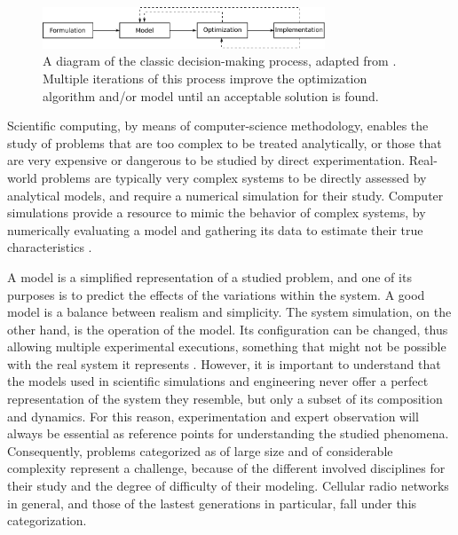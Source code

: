 \begin{figure}
\centering

\includegraphics[width=0.75\textwidth]{01-introduction/img/decision_making_process}

\caption{A diagram of the classic decision-making process, adapted from \cite{Talbi_Metaheuristics:2009}.
Multiple iterations of this process improve the optimization algorithm
and/or model until an acceptable solution is found. \label{fig:01-decision_making_process}}
\end{figure}


\bigskip{}


Scientific computing, by means of computer-science methodology, enables
the study of problems that are too complex to be treated analytically,
or those that are very expensive or dangerous to be studied by direct
experimentation. Real-world problems are typically very complex systems
to be directly assessed by analytical models, and require a numerical
simulation for their study. Computer simulations provide a resource
to mimic the behavior of complex systems, by numerically evaluating
a model and gathering its data to estimate their true characteristics
\cite{law2007simulation}.

A model is a simplified representation of a studied problem, and one
of its purposes is to predict the effects of the variations within
the system. A good model is a balance between realism and simplicity.
The system simulation, on the other hand, is the operation of the
model. Its configuration can be changed, thus allowing multiple experimental
executions, something that might not be possible with the real system
it represents \cite{maria1997introduction}. However, it is important
to understand that the models used in scientific simulations and engineering
never offer a perfect representation of the system they resemble,
but only a subset of its composition and dynamics. For this reason,
experimentation and expert observation will always be essential as
reference points for understanding the studied phenomena. Consequently,
problems categorized as of large size and of considerable complexity
represent a challenge, because of the different involved disciplines
for their study and the degree of difficulty of their modeling. Cellular
radio networks in general, and those of the lastest generations in
particular, fall under this categorization.


